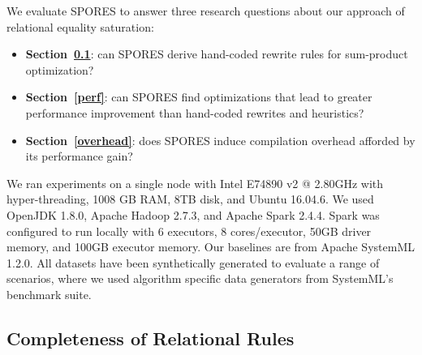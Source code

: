 We evaluate SPORES to answer three research questions about our
approach of relational equality saturation: 
\begin{itemize}
    \item \textbf{Section~\ref{relcomp}}: can SPORES derive hand-coded
      rewrite rules for sum-product optimization?
    \item \textbf{Section~\ref{perf}}: can SPORES find optimizations that
      lead to greater performance improvement than hand-coded rewrites and
      heuristics? 
      \item \textbf{Section~\ref{overhead}}: does SPORES induce compilation overhead afforded by its performance gain?  
\end{itemize}

We ran experiments on a single node with Intel E74890 v2 @ 2.80GHz with hyper-threading, 
1008 GB RAM, 8TB
disk, and Ubuntu 16.04.6. We used OpenJDK 1.8.0, Apache Hadoop 2.7.3, and Apache
Spark 2.4.4. Spark was configured to run locally with 6 executors, 8
cores/executor, 50GB driver memory, and 100GB executor memory. Our baselines are
from Apache SystemML 1.2.0. All datasets have been synthetically generated to
evaluate a range of scenarios, where we used algorithm specific data generators
from SystemML's benchmark suite.

\subsection{Completeness of Relational Rules} \label{relcomp}

